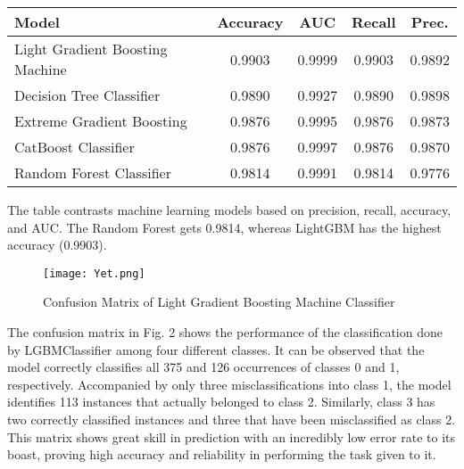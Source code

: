 \documentclass[conference]{IEEEtran}
\begin{document}
\begin{table}[htbp]
\centering
\caption{}
\setlength{\tabcolsep}{4pt} %
\renewcommand{\arraystretch}{1.2} %
\begin{tabular}{p{4cm} c c c c} %
\hline
\textbf{Model} & \textbf{Accuracy} & \textbf{AUC} & \textbf{Recall} & \textbf{Prec.} \\
\hline
Light Gradient Boosting Machine & 0.9903 & 0.9999 & 0.9903 & 0.9892 \\ 
Decision Tree Classifier        & 0.9890 & 0.9927 & 0.9890 & 0.9898 \\
Extreme Gradient Boosting       & 0.9876 & 0.9995 & 0.9876 & 0.9873 \\
CatBoost Classifier             & 0.9876 & 0.9997 & 0.9876 & 0.9870 \\
Random Forest Classifier        & 0.9814 & 0.9991 & 0.9814 & 0.9776 \\
\hline
\end{tabular}
\label{tab:performance}
\end{table}

The table contrasts machine learning models based on precision, recall, accuracy, and AUC. The Random Forest gets 0.9814, whereas LightGBM has the highest accuracy (0.9903).

\clearpage

\begin{figure}[htbp]
    \vspace{0pt}
    \centering
    \texttt{[image: Yet.png]}
    \vspace{0pt}
    \caption{Confusion Matrix of  Light Gradient Boosting Machine Classifier}
    \label{fig:workflow}
    \vspace{0pt}
\end{figure}

The confusion matrix in Fig. 2 shows the performance of the classification done by LGBMClassifier among four different classes. It can be observed that the model correctly classifies all 375 and 126 occurrences of classes 0 and 1, respectively. Accompanied by only three misclassifications into class 1, the model identifies 113 instances that actually belonged to class 2. Similarly, class 3 has two correctly classified instances and three that have been misclassified as class 2. This matrix shows great skill in prediction with an incredibly low error rate to its boast, proving high accuracy and reliability in performing the task given to it.
\end{document}
